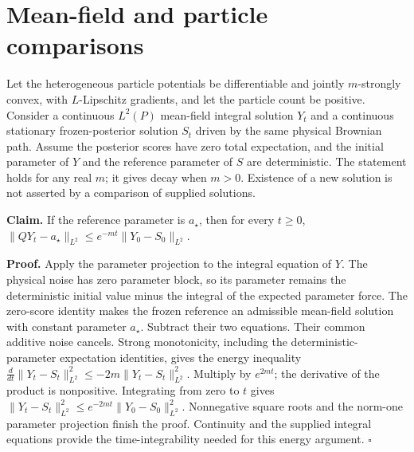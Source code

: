 \documentclass[11pt,a4paper]{report}
\begin{document}
\section{\texorpdfstring{Mean-field and particle comparisons}{Mean-field and particle comparisons}}


Let the heterogeneous particle potentials be differentiable and jointly \(m\)-strongly convex, with \(L\)-Lipschitz gradients, and let the particle count be positive. Consider a continuous \(L^2(P)\) mean-field integral solution \(Y_t\) and a continuous stationary frozen-posterior solution \(S_t\) driven by the same physical Brownian path. Assume the posterior scores have zero total expectation, and the initial parameter of \(Y\) and the reference parameter of \(S\) are deterministic. The statement holds for any real \(m\); it gives decay when \(m>0\). Existence of a new solution is not asserted by a comparison of supplied solutions.



\textbf{Claim.} If the reference parameter is \(a_\star\), then for every \(t\ge0\), \(\|QY_t-a_\star\|_{L^2}\le e^{-mt}\|Y_0-S_0\|_{L^2}\).



\textbf{Proof.} Apply the parameter projection to the integral equation of \(Y\). The physical noise has zero parameter block, so its parameter remains the deterministic initial value minus the integral of the expected parameter force. The zero-score identity makes the frozen reference an admissible mean-field solution with constant parameter \(a_\star\). Subtract their two equations. Their common additive noise cancels. Strong monotonicity, including the deterministic-parameter expectation identities, gives the energy inequality \(\frac d{dt}\|Y_t-S_t\|_{L^2}^2\le-2m\|Y_t-S_t\|_{L^2}^2\). Multiply by \(e^{2mt}\); the derivative of the product is nonpositive. Integrating from zero to \(t\) gives \(\|Y_t-S_t\|_{L^2}^2\le e^{-2mt}\|Y_0-S_0\|_{L^2}^2\). Nonnegative square roots and the norm-one parameter projection finish the proof. Continuity and the supplied integral equations provide the time-integrability needed for this energy argument. \(\square\)
\end{document}
